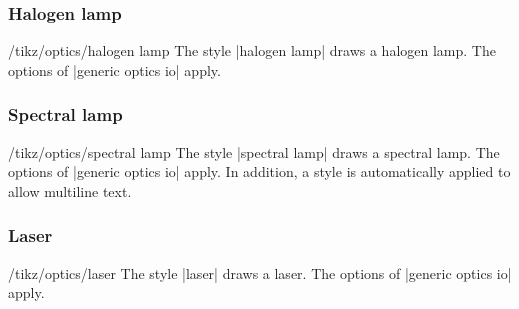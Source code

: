 \documentclass[a4paper]{ltxdoc}
\begin{document}
\subsubsection{Halogen lamp}

\begin{stylekey}{/tikz/optics/halogen lamp}
The style |halogen lamp| draws a halogen lamp. 
The options of |generic optics io| apply.

\begin{codeexample}[width=6cm]
\end{codeexample}
\end{stylekey}

\subsubsection{Spectral lamp}

\begin{stylekey}{/tikz/optics/spectral lamp}
The style |spectral lamp| draws a spectral lamp.
The options of |generic optics io| apply.
In addition, a style is automatically applied to allow multiline text.

\begin{codeexample}[width=6cm]
\end{codeexample}
\end{stylekey}

\subsubsection{Laser}

\begin{stylekey}{/tikz/optics/laser}
The style |laser| draws a laser.
The options of |generic optics io| apply.

\begin{codeexample}[width=6cm]
\end{codeexample}
\end{stylekey}
\end{document}

